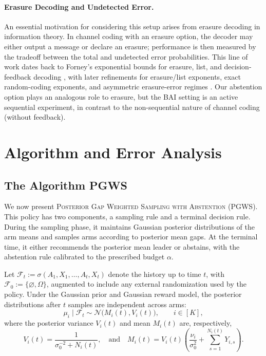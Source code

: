 \documentclass[10pt]{article}
\newcommand{\ouralgfull}{\textsc{Posterior Gap Weighted Sampling with Abstention}}
\newcommand{\ouralg}{{\textnormal{\textsc{PGWS}}}}
\theoremstyle{plain}
\begin{document}
\paragraph{Erasure Decoding and Undetected Error.}
An essential motivation for considering this setup arises from erasure decoding in information theory. In
channel coding with an erasure option, the decoder may either output a message or declare an erasure; performance is then measured by the tradeoff between the total   and undetected error probabilities. 
This line of work dates back to Forney's exponential bounds for erasure, list, and decision-feedback decoding \citep{forney1968exponential}, with later refinements for erasure/list exponents,
exact random-coding exponents, and asymmetric erasure-error regimes
\citep{merhav2008error,somekhbaruch2011exact,hayashi2015asymmetric}. Our
abstention option plays an analogous role to erasure, but the BAI setting is an
active sequential experiment, in contrast to the non-sequential nature of channel coding (without feedback). %





\section{Algorithm and Error Analysis}

\subsection{The Algorithm  \ouralg{}}
\label{subsec:pgws-algorithm}

We now present \ouralgfull{} (\ouralg{}). This policy has two components, a sampling rule and a terminal decision rule. During the sampling phase,
it maintains   Gaussian posterior distributions of the arm means and 
samples arms according to posterior mean gaps. At the terminal time, it either
recommends the posterior mean leader or abstains, with the abstention rule
calibrated to the prescribed budget \(\alpha\).

Let \(\mathcal F_t:=\sigma(A_1,X_1,\ldots,A_t,X_t)\) denote the history up to time \(t\), with $\mathcal F_0:=\{\varnothing,\Omega\}$, augmented to include any external randomization used by the policy. Under the Gaussian prior and
Gaussian reward model, the posterior distributions after \(t\) samples are
independent across arms:
\[
    \mu_i\mid \mathcal F_t
    \sim
    \mathcal N\big(M_i(t),V_i(t)\big),
    \qquad i\in[K],
\]
where the posterior variance $V_i(t)$ and mean $M_i(t)$ are, respectively,
\begin{equation}
\label{eq:pgws-posterior-update}
    V_i(t)
    =
    \frac{1}{\sigma_0^{-2}+N_i(t)},
    \quad\mbox{and}\quad
    M_i(t)
    =
    V_i(t)
    \left(
        \frac{\nu_i}{\sigma_0^2}
        +
        \sum_{s=1}^{N_i(t)}Y_{i,s}
    \right).
\end{equation}
\end{document}

